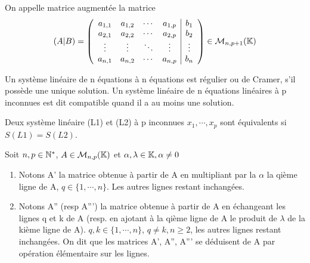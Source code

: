 \documentclass[a4paper, 12pt]{article}
\begin{document}
\begin{definition}
    On appelle matrice augmentée la matrice
    $$
    (A|B) = \left(
    \begin{array}{cccc|c}
        a_{1,1} & a_{1,2} & \cdots & a_{1,p} & b_1 \\
        a_{2,1} & a_{2,2} & \cdots & a_{2,p} & b_2 \\
        \vdots & \vdots & \ddots & \vdots & \vdots \\
        a_{n,1} & a_{n,2} & \cdots & a_{n,p} & b_n \\
    \end{array}
    \right)
    \in \mathcal{M}_{n,p+1}(\mathbb{K})
    $$
\end{definition}

\begin{definition}
    Un système linéaire de n équations à n équations est régulier ou de Cramer, s'il possède une unique solution.
    Un système linéaire de n équations linéaires à p inconnues est dit compatible quand il a au moins une solution.
\end{definition}

\begin{definition}
    Deux système linéaire (L1) et (L2) à p inconnues $x_1, \cdots, x_p$ sont équivalents si $S(L1) = S(L2)$.
\end{definition}

\begin{definition}
    Soit $n, p \in \mathbb{N}^*$, $A \in \mathcal{M}_{n,p}(\mathbb{K})$ et $\alpha, \lambda \in \mathbb{K}, \alpha \neq 0$
    \begin{enumerate}
        \item Notons A' la matrice obtenue à partir de A en multipliant par la $\alpha$ la qième ligne de A, $q \in \{1, \cdots, n\}$. Les autres lignes restant inchangées.
        \item Notons A'' (resp A''') la matrice obtenue à partir de A en échangeant les lignes q et k de A (resp. en ajotant à la qième ligne de A le produit de $\lambda$ de la kième ligne de A).
        $q, k \in \{1, \cdots, n\}$, $q \neq k, n \geq 2$, les autres lignes restant inchangées.
        On dit que les matrices A', A'', A''' se déduisent de A par opération élémentaire sur les lignes.
    \end{enumerate}
\end{definition}

\end{document}
